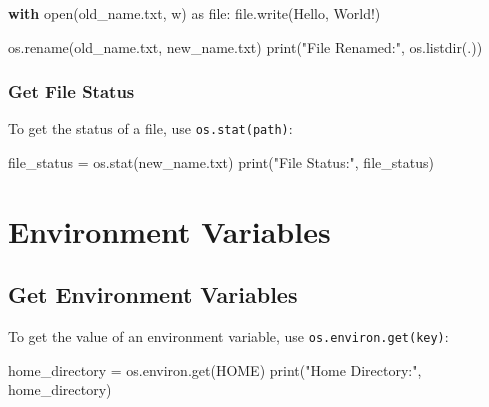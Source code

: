 \documentclass[
  letterpaper,
  DIV=11,
  numbers=noendperiod]{scrreprt}
\newenvironment{Shaded}{\begin{snugshade}}{\end{snugshade}}
\newcommand{\BuiltInTok}[1]{\textcolor[rgb]{0.00,0.23,0.31}{#1}}
\newcommand{\ControlFlowTok}[1]{\textcolor[rgb]{0.00,0.23,0.31}{\textbf{#1}}}
\newcommand{\ImportTok}[1]{\textcolor[rgb]{0.00,0.46,0.62}{#1}}
\newcommand{\NormalTok}[1]{\textcolor[rgb]{0.00,0.23,0.31}{#1}}
\newcommand{\OperatorTok}[1]{\textcolor[rgb]{0.37,0.37,0.37}{#1}}
\newcommand{\StringTok}[1]{\textcolor[rgb]{0.13,0.47,0.30}{#1}}
\begin{document}
\begin{Shaded}
\begin{Highlighting}[]
\ControlFlowTok{with} \BuiltInTok{open}\NormalTok{(}\StringTok{\textquotesingle{}old\_name.txt\textquotesingle{}}\NormalTok{, }\StringTok{\textquotesingle{}w\textquotesingle{}}\NormalTok{) }\ImportTok{as} \BuiltInTok{file}\NormalTok{:}
    \BuiltInTok{file}\NormalTok{.write(}\StringTok{\textquotesingle{}Hello, World!\textquotesingle{}}\NormalTok{)}

\NormalTok{os.rename(}\StringTok{\textquotesingle{}old\_name.txt\textquotesingle{}}\NormalTok{, }\StringTok{\textquotesingle{}new\_name.txt\textquotesingle{}}\NormalTok{)}
\BuiltInTok{print}\NormalTok{(}\StringTok{"File Renamed:"}\NormalTok{, os.listdir(}\StringTok{\textquotesingle{}.\textquotesingle{}}\NormalTok{))}
\end{Highlighting}
\end{Shaded}

\subsubsection{Get File Status}\label{get-file-status}

To get the status of a file, use \texttt{os.stat(path)}:

\begin{Shaded}
\begin{Highlighting}[]
\NormalTok{file\_status }\OperatorTok{=}\NormalTok{ os.stat(}\StringTok{\textquotesingle{}new\_name.txt\textquotesingle{}}\NormalTok{)}
\BuiltInTok{print}\NormalTok{(}\StringTok{"File Status:"}\NormalTok{, file\_status)}
\end{Highlighting}
\end{Shaded}

\section{Environment Variables}\label{environment-variables}

\subsection{Get Environment Variables}\label{get-environment-variables}

To get the value of an environment variable, use
\texttt{os.environ.get(key)}:

\begin{Shaded}
\begin{Highlighting}[]
\NormalTok{home\_directory }\OperatorTok{=}\NormalTok{ os.environ.get(}\StringTok{\textquotesingle{}HOME\textquotesingle{}}\NormalTok{)}
\BuiltInTok{print}\NormalTok{(}\StringTok{"Home Directory:"}\NormalTok{, home\_directory)}
\end{Highlighting}
\end{Shaded}
\end{document}
